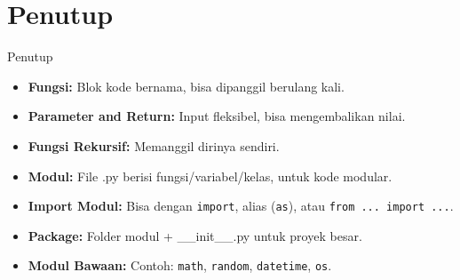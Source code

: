\documentclass[aspectratio=169, table]{beamer}
\begin{document}
\section{Penutup}
\begin{frame}{Penutup}
\begin{itemize}
    \item \textbf{Fungsi:} Blok kode bernama, bisa dipanggil berulang kali.
    \item \textbf{Parameter and Return:} Input fleksibel, bisa mengembalikan nilai.
    \item \textbf{Fungsi Rekursif:} Memanggil dirinya sendiri.
    \item \textbf{Modul:} File .py berisi fungsi/variabel/kelas, untuk kode modular.
    \item \textbf{Import Modul:} Bisa dengan \texttt{import}, alias (\texttt{as}), atau \texttt{from ... import ...}.
    \item \textbf{Package:} Folder modul + \_\_init\_\_.py untuk proyek besar.
    \item \textbf{Modul Bawaan:} Contoh: \texttt{math}, \texttt{random}, \texttt{datetime}, \texttt{os}.
\end{itemize}
\end{frame}
\end{document}

